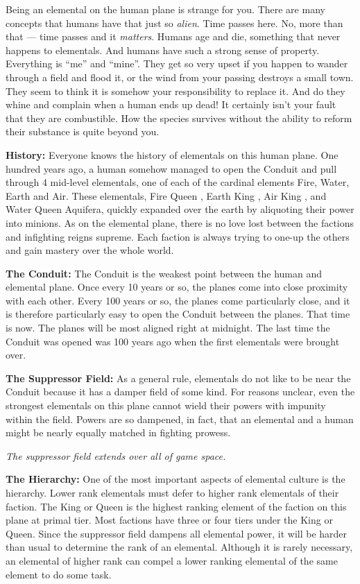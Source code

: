 \documentclass[blue]{elementals}
\begin{document}
\name{\bElemental{}}

Being an elemental on the human plane is strange for you. There are many concepts that humans have that just so \emph{alien}. Time passes here. No, more than that --- time passes and it \emph{matters}. Humans age and die, something that never happens to elementals. And humans have such a strong sense of property. Everything is ``me'' and ``mine''.  They get so very upset if you happen to wander through a field and flood it, or the wind from your passing destroys a small town. They seem to think it is somehow your responsibility to replace it. And do they whine and complain when a human ends up dead! It certainly isn't your fault that they are combustible. How the species survives without the ability to reform their substance is quite beyond you.

{\bf History:}
Everyone knows the history of elementals on this human plane. One hundred years ago, a human somehow managed to open the Conduit and pull through 4 mid-level elementals, one of each of the cardinal elements Fire, Water, Earth and Air. These elementals, Fire Queen \cQueen{}, Earth King \cEarthKing{}, Air King \cKing{}, and Water Queen Aquifera,  quickly expanded over the earth by aliquoting their power into minions. As on the elemental plane, there is no love lost between the factions and infighting reigns supreme. Each faction is always trying to one-up the others and gain mastery over the whole world.

{\bf The Conduit:}
The Conduit is the weakest point between the human and elemental plane. Once every 10 years or so, the planes come into close proximity with each other. Every 100 years or so, the planes come particularly close, and it is therefore particularly easy to open the Conduit between the planes. That time is now. The planes will be most aligned right at midnight. The last time the Conduit was opened was 100 years ago when the first elementals were brought over.

{\bf The Suppressor Field:}
As a general rule, elementals do not like to be near the Conduit because it has a damper field of some kind. For reasons unclear, even the strongest elementals on this plane cannot wield their powers with impunity within the field. Powers are so dampened, in fact, that an elemental and a human might be nearly equally matched in fighting prowess.

\emph{The suppressor field extends over all of game space.}

{\bf The Hierarchy:}
One of the most important aspects of elemental culture is the hierarchy. Lower rank elementals must defer to higher rank elementals of their faction. The King or Queen is the highest ranking element of the faction on this plane at primal tier. Most factions have three or four tiers under the King or Queen.  Since the suppressor field dampens all elemental power, it will be harder than usual to determine the rank of an elemental. Although it is rarely necessary, an elemental of higher rank can compel a lower ranking elemental of the same element to do some task.
\end{document}

